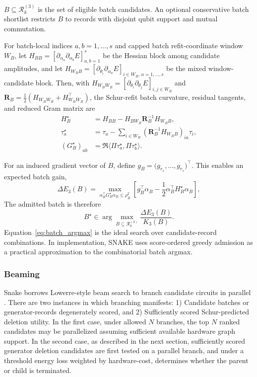\documentclass[
  reprint,
  amsmath,
  amssymb,
  aps,
  pra,
  nofootinbib,
  superscriptaddress,
  floatfix
]{revtex4-2}
\begin{document}
$B\subseteq\mathcal R_k^{(3)}$ is the set of eligible batch candidates.  An optional conservative batch shortlist restricts \(B\) to records with disjoint qubit support and mutual commutation.

For batch-local indices \(a,b=1,\ldots,s\) and capped batch refit-coordinate window \(W_B\), let $H_{BB}=[\partial_{\alpha_a}\partial_{\alpha_b}E]_{a,b=1}^s$ be the Hessian block among candidate amplitudes, and let $H_{W_BB}=[\partial_{\theta_i}\partial_{\alpha_a}E]_{i\in W_B,\,a=1,\ldots,s}$ be the mixed window-candidate block. Then, with $H_{W_BW_B}=[\partial_{\theta_i}\partial_{\theta_j}E]_{i,j\in W_B}$ and $\mathbf R_B=\frac12(H_{W_BW_B}+H_{W_BW_B}^{\top})$, the Schur-refit batch curvature, residual tangents, and reduced Gram matrix are
\begin{equation}
\begin{aligned}
H_B^\star
&=
H_{BB}
-
H_{BW_B}\mathbf R_B^{-1}H_{W_BB},\\
\tau_a^\star
&=\tau_a-\sum_{i\in W_B}(\mathbf R_B^{-1}H_{W_BB})_{ia}\tau_i,\\
(G_B^\star)_{ab}
&=\Re\langle \Pi\tau_a^\star,\Pi\tau_b^\star\rangle .
\end{aligned}
\label{eq:batch_schur_curvature}
\end{equation}

For an induced gradient vector of $B$, define \(g_B=\big(g_{r_1},\ldots,g_{r_s}\big)^\top\). This enables an expected batch gain,
\begin{equation}
\Delta E_3(B)
=
\max_{\alpha_B^\top G_B^\star\alpha_B\le \rho_B^2}
\left[
g_B^\top\alpha_B
-
\frac12\alpha_B^\top H_B^\star\alpha_B
\right],
\label{eq:batch_expected_gain}
\end{equation}
The admitted batch is therefore
\begin{equation}
B^\star\in\arg\max_{B\subseteq\mathcal R_k^{(3)}}\frac{\Delta E_3(B)}{K_3(B)}.
\label{eq:batch_argmax}
\end{equation}
Equation~\eqref{eq:batch_argmax} is the ideal search over candidate-record
combinations. In implementation, SNAKE uses score-ordered greedy admission as a
practical approximation to the combinatorial batch argmax.

\subsubsection{Beaming}
Snake borrows Lowerre-style beam search to branch candidate circuits in parallel \cite{Lowerre1976Beam}.
There are two instances in which branching manifests: 1) Candidate batches or generator-records degenerately scored, and 2) Sufficiently scored Schur-predicted deletion utility. In the first case, under allowed $N$ branches, the top $N$ ranked candidates may be parallelized assuming sufficient available hardware graph support. In the second case, as described in the next section, sufficiently scored generator deletion candidates are first tested on a parallel branch, and under a threshold energy loss weighted by hardware-cost, determines whether the parent or child is terminated.
\end{document}
